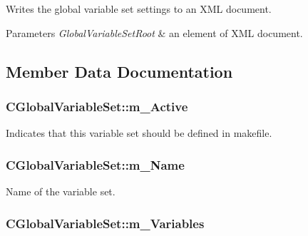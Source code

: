 Writes the global variable set settings to an X\-M\-L document. 


\begin{DoxyParams}{Parameters}
{\em Global\-Variable\-Set\-Root} & an element of X\-M\-L document. \\
\hline
\end{DoxyParams}


\subsection{Member Data Documentation}
\hypertarget{classCGlobalVariableSet_a3505dd291a7e3ed49faef044b74212ea}{
\subsubsection[{m\-\_\-\-Active}]{\setlength{\rightskip}{0pt plus 5cm}C\-Global\-Variable\-Set\-::m\-\_\-\-Active\hspace{0.3cm}{\ttfamily [private]}}}\label{classCGlobalVariableSet_a3505dd291a7e3ed49faef044b74212ea}


Indicates that this variable set should be defined in makefile. 

\hypertarget{classCGlobalVariableSet_ac843c7965c6986d37b163b82250de04c}{
\subsubsection[{m\-\_\-\-Name}]{\setlength{\rightskip}{0pt plus 5cm}C\-Global\-Variable\-Set\-::m\-\_\-\-Name\hspace{0.3cm}{\ttfamily [private]}}}\label{classCGlobalVariableSet_ac843c7965c6986d37b163b82250de04c}


Name of the variable set. 

\hypertarget{classCGlobalVariableSet_ab9e5a9983873c06218132833a870e36a}{
\subsubsection[{m\-\_\-\-Variables}]{\setlength{\rightskip}{0pt plus 5cm}C\-Global\-Variable\-Set\-::m\-\_\-\-Variables\hspace{0.3cm}{\ttfamily [private]}}}\label{classCGlobalVariableSet_ab9e5a9983873c06218132833a870e36a}


